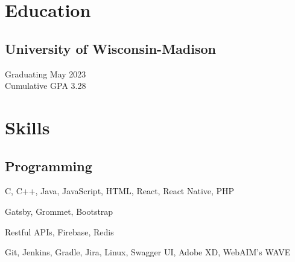 \documentclass[]{hieudo-build}
\begin{document}
%
%
\begin{minipage}[t]{0.34\textwidth} 

\section{Education} 

\subsection{University of Wisconsin-Madison}
Graduating May 2023 \\
Cumulative GPA 3.28\\
\sectionsep


\section{Skills}

\subsection{Programming}
\smallsectionsep

C, C++, Java, JavaScript, HTML, React, React Native, PHP\\ 
\smallsectionsep

Gatsby, Grommet, Bootstrap \\
\smallsectionsep

Restful APIs, Firebase, Redis \\
\smallsectionsep

Git, Jenkins, Gradle, Jira, Linux, Swagger UI, Adobe XD, WebAIM's WAVE\\
\sectionsep


\end{minipage}
\end{document}
